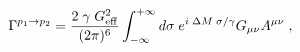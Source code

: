 \begin{equation} 
\Gamma^{p_1 \to p_2}
=
\frac{2\; \gamma\; G_{\rm eff}^2}{(2\pi)^6 }
\int_{- \infty}^{+\infty} d \sigma \;
e^{i\; \Delta M \; \sigma/\gamma} 
G_{\mu \nu} A^{\mu \nu} \; ,
\label{Gaux2}
\end{equation}

